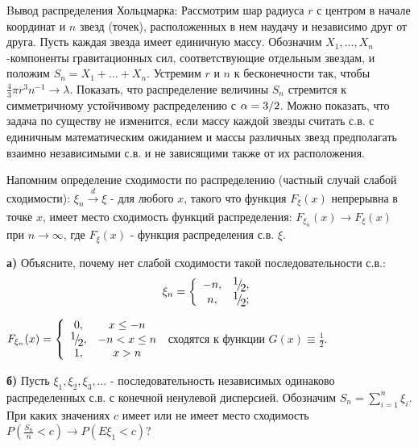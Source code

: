 \begin{problem}
Bывод распределения Хольцмарка: Рассмотрим шар радиуса $r$ с центром в начале координат и $n$ звезд (точек), расположенных в нем наудачу и независимо друг от друга. Пусть каждая звезда имеет единичную массу. Обозначим $X_{1} ,...,X_{n} $ -компоненты гравитационных сил, соответствующие отдельным звездам, и положим $S_{n} =X_{1} +...+X_{n} $. Устремим $r$ и $n$ к бесконечности так, чтобы $\frac{4}{3} \pi r^{3} n^{-1} \to \lambda $. Показать, что распределение величины $S_{n} $ стремится к симметричному устойчивому распределению с $\alpha ={3\mathord{\left/ {\vphantom {3 2}} \right. \kern-\nulldelimiterspace} 2} $. Можно показать, что задача по существу не изменится, если массу каждой звезды считать с.в. с единичным математическим ожиданием и массы различных звезд предполагать взаимно независимыми с.в. и не зависящими также от их расположения.
\end{problem}

\begin{problem}
Напомним определение сходимости по распределению (частный случай слабой сходимости): $\xi _{n} \mathop{\to }\limits_{}^{d} \xi $ - для любого $x$, такого что функция $F_{\xi } (x)$ непрерывна в точке $x$, имеет место сходимость функций распределения: $F_{\xi _{n} } (x)\to F_{\xi } (x)$ при $n\to \infty $, где $F_{\xi } (x)$ - функция распределения с.в. $\xi $.

\noindent \textbf{а)} Объясните, почему нет слабой сходимости такой последовательности с.в.:
\[\xi _{n} =\left\{\begin{array}{cc} {-n,} & {{\raise0.7ex\hbox{$ 1 $}\!\mathord{\left/ {\vphantom {1 2}} \right. \kern-\nulldelimiterspace}\!\lower0.7ex\hbox{$ 2 $}} ,} \\ {n,} & {{\raise0.7ex\hbox{$ 1 $}\!\mathord{\left/ {\vphantom {1 2}} \right. \kern-\nulldelimiterspace}\!\lower0.7ex\hbox{$ 2 $}} ;} \end{array}\right. \] 

\begin{ordre} 

\noindent $F_{\xi _{n} } (x)=\left\{\begin{array}{cc} {0,} & {x\le -n} \\ {{\raise0.7ex\hbox{$ 1 $}\!\mathord{\left/ {\vphantom {1 2}} \right. \kern-\nulldelimiterspace}\!\lower0.7ex\hbox{$ 2 $}} ,} & {-n<x\le n} \\ {1,} & {x>n} \end{array}\right. $ сходятся к функции $G(x)\equiv \frac{1}{2} $.

\end{ordre} 

\noindent \textbf{б)} Пусть $\xi _{1} ,\xi _{2} ,\xi _{3} ,...$ - последовательность независимых одинаково распределенных с.в. с конечной ненулевой дисперсией. Обозначим $S_{n} =\sum _{i=1}^{n}\xi _{i}  $. При каких значениях $c$ имеет или не имеет место сходимость $P\left(\frac{S_{n} }{n} <c\right)\to P\left(E\xi _{1} <c\right)$?


\end{problem}

